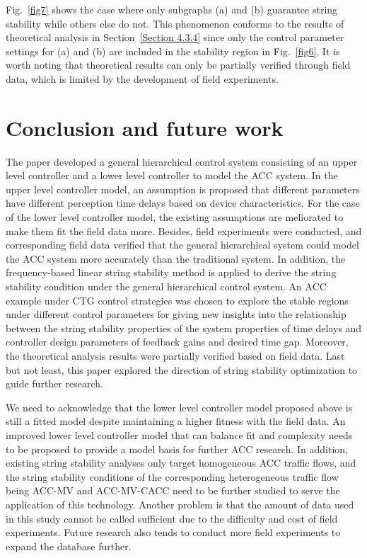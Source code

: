 \documentclass[a4paper]{cas-sc}
\begin{document}
Fig.~\ref{fig7} shows the case where only subgraphs (a) and (b) guarantee string stability while others else do not. This phenomenon conforms to the results of theoretical analysis in Section~\ref{Section 4.3.4} since only the control parameter settings for (a) and (b) are included in the stability region in Fig.~\ref{fig6}. It is worth noting that theoretical results can only be partially verified through field data, which is limited by the development of field experiments.


\section{Conclusion and future work}
\label{Section 5}

The paper developed a general hierarchical control system consisting of an upper level controller and a lower level controller to model the ACC system. In the upper level controller model, an assumption is proposed that different parameters have different perception time delays based on device characteristics. For the case of the lower level controller model, the existing assumptions are meliorated to make them fit the field data more. Besides, field experiments were conducted, and corresponding field data verified that the general hierarchical system could model the ACC system more accurately than the traditional system. In addition, the frequency-based linear string stability method is applied to derive the string stability condition under the general hierarchical control system. An ACC example under CTG control strategies was chosen to explore the stable regions under different control parameters for giving new insights into the relationship between the string stability properties of the system properties of time delays and controller design parameters of feedback gains and desired time gap. Moreover, the theoretical analysis results were partially verified based on field data. Last but not least, this paper explored the direction of string stability optimization to guide further research.

We need to acknowledge that the lower level controller model proposed above is still a fitted model despite maintaining a higher fitness with the field data. An improved lower level controller model that can balance fit and complexity needs to be proposed to provide a model basis for further ACC research. In addition, existing string stability analyses only target homogeneous ACC traffic flows, and the string stability conditions of the corresponding heterogeneous traffic flow being ACC-MV and ACC-MV-CACC need to be further studied to serve the application of this technology. Another problem is that the amount of data used in this study cannot be called sufficient due to the difficulty and cost of field experiments. Future research also tends to conduct more field experiments to expand the database further.
\end{document}
